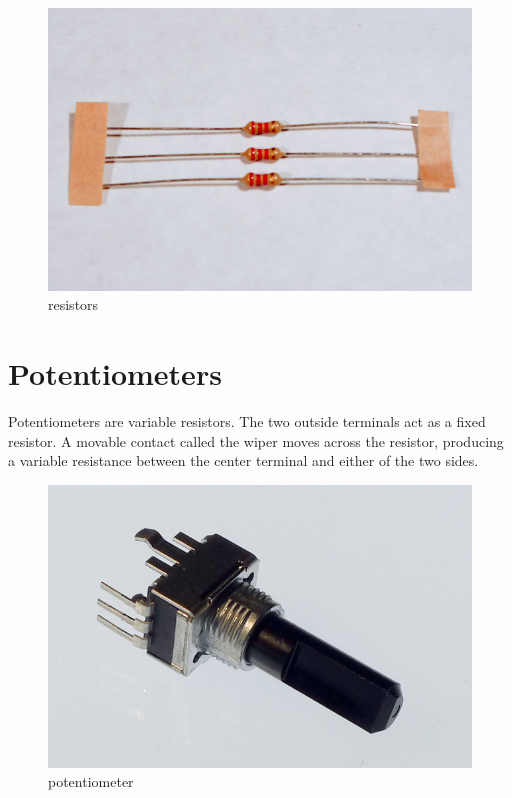 \begin{figure}[!htb]
     \centering
     \includegraphics[scale=0.3]{img/components/resistors.jpg}
     \caption{resistors}
     \label{resistors}
\end{figure}

\section{Potentiometers}


Potentiometers are variable resistors. The two outside terminals act as a fixed resistor. A movable contact called the wiper moves across the resistor, producing a variable resistance between the center terminal and either of the two sides. 

\begin{figure}[!htb]
     \centering
     \includegraphics[scale=0.25]{img/components/potentiometer.jpg}
     \caption{potentiometer}
     \label{potentiometer}
\end{figure}

